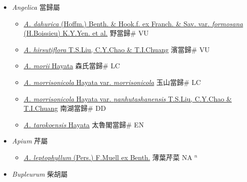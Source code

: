 
  \begin{itemize}
 \item[] \textit{Angelica} 當歸屬
                    
  \begin{itemize}
        \item[] \href{http://www.theplantlist.org/tpl1.1/search?q=Angelica+dahurica+var.+formosana}{\textit{A. dahurica} (Hoffm.) Benth. \& Hook.f. ex Franch. \& Sav. var. \textit{formosana} (H.Boissieu) K.Y.Yen. et al.}   野當歸\# VU
        \item[] \href{http://www.theplantlist.org/tpl1.1/search?q=Angelica+hirsutiflora}{\textit{A. hirsutiflora} T.S.Liu, C.Y.Chao \& T.I.Chuang}   濱當歸\# VU
        \item[] \href{http://www.theplantlist.org/tpl1.1/search?q=Angelica+morii}{\textit{A. morii} Hayata}   森氏當歸\# LC
        \item[] \href{http://www.theplantlist.org/tpl1.1/search?q=Angelica+morrisonicola+var.+morrisonicola}{\textit{A. morrisonicola} Hayata var. \textit{morrisonicola}}   玉山當歸\# LC
        \item[] \href{http://www.theplantlist.org/tpl1.1/search?q=Angelica+morrisonicola+var.+nanhutashanensis}{\textit{A. morrisonicola} Hayata var. \textit{nanhutashanensis} T.S.Liu, C.Y.Chao \& T.I.Chuang}   南湖當歸\# DD
        \item[] \href{http://www.theplantlist.org/tpl1.1/search?q=Angelica+tarokoensis}{\textit{A. tarokoensis} Hayata}   太魯閣當歸\# EN
  \end{itemize}
 \item[] \textit{Apium} 芹屬
                    
  \begin{itemize}
        \item[] \href{http://www.theplantlist.org/tpl1.1/search?q=Apium+leptophyllum}{\textit{A. leptophyllum} (Pers.) F.Muell ex Benth.}   薄葉芹菜 NA $^n$
  \end{itemize}
 \item[] \textit{Bupleurum} 柴胡屬
                    

\end{itemize}
